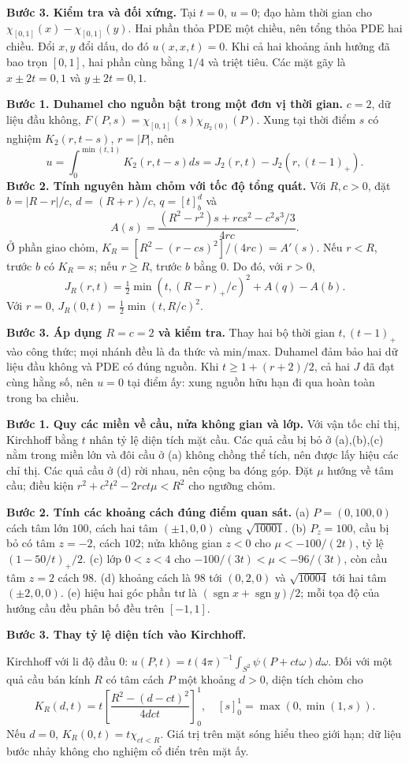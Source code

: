 \textbf{Bước 3. Kiểm tra và đối xứng.} Tại $t=0$, $u=0$; đạo hàm thời gian cho $\chi_{[0,1]}(x)-\chi_{[0,1]}(y)$. Hai phần thỏa PDE một chiều, nên tổng thỏa PDE hai chiều. Đổi $x,y$ đổi dấu, do đó $u(x,x,t)=0$. Khi cả hai khoảng ảnh hưởng đã bao trọn $[0,1]$, hai phần cùng bằng $1/4$ và triệt tiêu. Các mặt gãy là $x\pm2t=0,1$ và $y\pm2t=0,1$.

\textbf{Bước 1. Duhamel cho nguồn bật trong một đơn vị thời gian.} $c=2$, dữ liệu đầu không, $F(P,s)=\chi_{[0,1]}(s)\chi_{B_2(0)}(P)$. Xung tại thời điểm $s$ có nghiệm $K_2(r,t-s)$, $r=|P|$, nên
\[u=\int_0^{\min(t,1)}K_2(r,t-s)ds=J_2(r,t)-J_2(r,(t-1)_+).\]
\textbf{Bước 2. Tính nguyên hàm chỏm với tốc độ tổng quát.} Với $R,c>0$, đặt $b=|R-r|/c$, $d=(R+r)/c$, $q=[t]_b^d$ và
\[A(s)=\frac{(R^2-r^2)s+rcs^2-c^2s^3/3}{4rc}.\]
Ở phần giao chỏm, $K_R=[R^2-(r-cs)^2]/(4rc)=A'(s)$. Nếu $r<R$, trước $b$ có $K_R=s$; nếu $r\ge R$, trước $b$ bằng $0$. Do đó, với $r>0$,
\[J_R(r,t)=\tfrac12\min(t,(R-r)_+/c)^2+A(q)-A(b).\]
Với $r=0$, $J_R(0,t)=\frac12\min(t,R/c)^2$.

\textbf{Bước 3. Áp dụng $R=c=2$ và kiểm tra.} Thay hai bộ thời gian $t,(t-1)_+$ vào công thức; mọi nhánh đều là đa thức và min/max. Duhamel đảm bảo hai dữ liệu đầu không và PDE có đúng nguồn. Khi $t\ge1+(r+2)/2$, cả hai $J$ đã đạt cùng hằng số, nên $u=0$ tại điểm ấy: xung nguồn hữu hạn đi qua hoàn toàn trong ba chiều.

\textbf{Bước 1. Quy các miền về cầu, nửa không gian và lớp.} Với vận tốc chỉ thị, Kirchhoff bằng $t$ nhân tỷ lệ diện tích mặt cầu. Các quả cầu bị bỏ ở (a),(b),(c) nằm trong miền lớn và đôi cầu ở (a) không chồng thể tích, nên được lấy hiệu các chỉ thị. Các quả cầu ở (d) rời nhau, nên cộng ba đóng góp. Đặt $\mu$ hướng về tâm cầu; điều kiện $r^2+c^2t^2-2rct\mu<R^2$ cho ngưỡng chỏm.

\textbf{Bước 2. Tính các khoảng cách đúng điểm quan sát.} (a) $P=(0,100,0)$ cách tâm lớn $100$, cách hai tâm $(\pm1,0,0)$ cùng $\sqrt{10001}$. (b) $P_z=100$, cầu bị bỏ có tâm $z=-2$, cách $102$; nửa không gian $z<0$ cho $\mu<-100/(2t)$, tỷ lệ $(1-50/t)_+/2$. (c) lớp $0<z<4$ cho $-100/(3t)<\mu<-96/(3t)$, còn cầu tâm $z=2$ cách $98$. (d) khoảng cách là $98$ tới $(0,2,0)$ và $\sqrt{10004}$ tới hai tâm $(\pm2,0,0)$. (e) hiệu hai góc phần tư là $(\operatorname{sgn}x+\operatorname{sgn}y)/2$; mỗi tọa độ của hướng cầu đều phân bố đều trên $[-1,1]$.

\textbf{Bước 3. Thay tỷ lệ diện tích vào Kirchhoff.}

Kirchhoff với li độ đầu 0: $u(P,t)=t(4\pi)^{-1}\int_{S^2}\psi(P+ct\omega)d\omega$. Đối với một quả cầu bán kính $R$ có tâm cách $P$ một khoảng $d>0$, diện tích chỏm cho
\[K_R(d,t)=t\left[\frac{R^2-(d-ct)^2}{4dct}\right]_0^1,\quad [s]_0^1=\max(0,\min(1,s)).\]
Nếu $d=0$, $K_R(0,t)=t\chi_{ct<R}$. Giá trị trên mặt sóng hiểu theo giới hạn; dữ liệu bước nhảy không cho nghiệm cổ điển trên mặt ấy.

